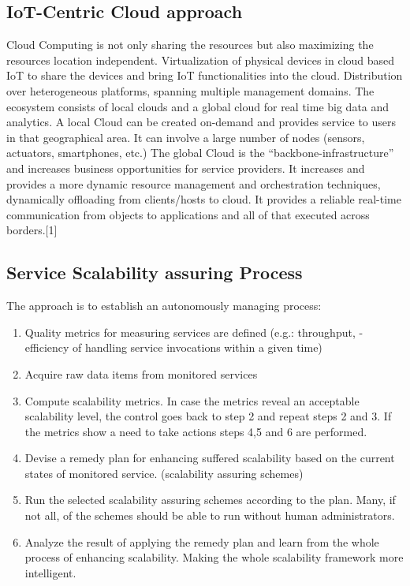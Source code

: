 \documentclass[sigconf]{acmart}
\begin{document}
\subsection{IoT-Centric Cloud approach}
Cloud Computing is not only sharing the resources but also
maximizing the resources location independent. Virtualization
of physical devices in cloud based IoT to share the devices and
bring IoT functionalities into the cloud. Distribution over
heterogeneous platforms, spanning multiple management
domains. The ecosystem consists of local clouds and a global
cloud for real time big data and analytics.
A local Cloud can be created on-demand and provides service
to users in that geographical area. It can involve a large
number of nodes (sensors, actuators, smartphones, etc.)
The global Cloud is the “backbone-infrastructure” and
increases business opportunities for service providers. It
increases and provides a more dynamic resource management
and orchestration techniques, dynamically offloading from
clients/hosts to cloud. It provides a reliable real-time
communication from objects to applications and all of that
executed across borders.[1]


\subsection{Service Scalability assuring Process}
The approach is to establish an autonomously managing
process:

\begin{enumerate}

\item Quality metrics for measuring services are defined
(e.g.: throughput, - efficiency of handling service
invocations within a given time)

\item Acquire raw data items from monitored services

\item Compute scalability metrics. In case the metrics
reveal an acceptable scalability level, the control
goes back to step 2 and repeat steps 2 and 3. If the
metrics show a need to take actions steps 4,5 and 6
are performed.

\item Devise a remedy plan for enhancing suffered
scalability based on the current states of monitored
service. (scalability assuring schemes)

\item Run the selected scalability assuring schemes
according to the plan. Many, if not all, of the schemes
should be able to run without human administrators.

\item Analyze the result of applying the remedy plan and
learn from the whole process of enhancing
scalability. Making the whole scalability framework
more intelligent.
\end{enumerate}
\end{document}
